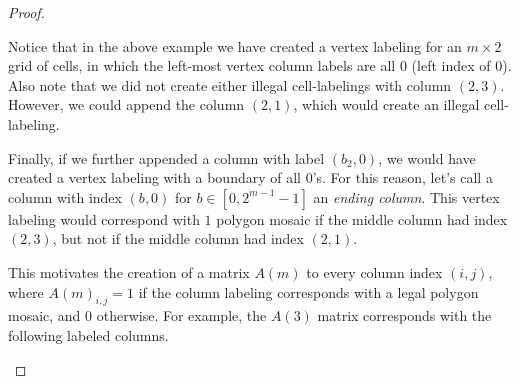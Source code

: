\documentclass[12pt]{article}
\theoremstyle{plain}
\theoremstyle{definition}
\theoremstyle{remark}
\theoremstyle{definition}
\newcommand{\cell}[4]{ \draw[thick] ( #1 , #2 ) rectangle ( #3 , #4 );}
\newcommand{\lablnode}[3]{\node[shape=circle,draw=none,fill=none, inner sep=0pt,minimum size=5pt] (A) at ( #1 , #2 ) {#3};}
\newcommand{\lablvertex}[3]{\node[shape=circle,draw=none,fill=white, inner sep=2pt,minimum size=5pt] (A) at ( #1 , #2 ) {#3};}
\begin{document}
\begin{proof}
\begin{center}
\end{center}

Notice that in the above example we have created a vertex labeling for an $m \times 2$ grid of cells, in which the left-most vertex column labels are all $0$ (left index of $0$). Also note that we did not create either illegal cell-labelings with column $(2,3)$. However, we could append the column $(2,1)$, which would create an illegal cell-labeling. 

Finally, if we further appended a column with label $(b_2,0)$, we would have created a vertex labeling with a boundary of all $0$'s. For this reason, let's call a column with index $(b,0)$ for $b \in [0,2^{m-1}-1]$ an \textit{ending column}. This vertex labeling would correspond with $1$ polygon mosaic if the middle column had index $(2,3)$, but not if the middle column had index $(2,1)$.

This motivates the creation of a matrix $A(m)$ to every column index $(i,j)$, where $A(m)_{i,j}=1$ if the column labeling corresponds with a legal polygon mosaic, and $0$ otherwise. For example, the $A(3)$ matrix corresponds with the following labeled columns. 

\begin{center}
\end{center}
\end{proof}
\end{document}
